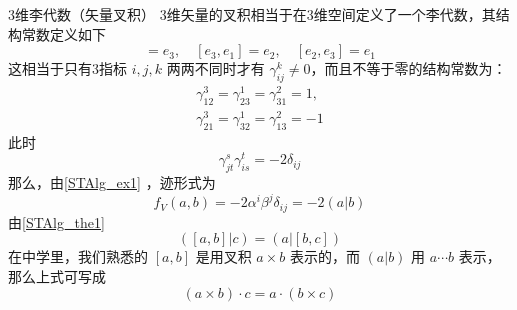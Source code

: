 \begin{example}{3维李代数（矢量叉积）}
3维矢量的叉积相当于在3维空间定义了一个李代数，其结构常数定义如下
\begin{equation}
[e_1,e_2]=e_3,\quad [e_3,e_1]=e_2,\quad [e_2,e_3]=e_1
\end{equation}
这相当于只有3指标 $i,j,k$ 两两不同时才有 $\gamma_{ij}^k\neq0$，而且不等于零的结构常数为：
\begin{equation}
\begin{aligned}
\gamma_{12}^3=\gamma_{23}^1=\gamma_{31}^2=1,\\
\gamma_{21}^3=\gamma_{32}^1=\gamma_{13}^2=-1
\end{aligned}
\end{equation}
此时
\begin{equation}
\gamma_{jt}^s\gamma_{is}^t=-2\delta_{ij}
\end{equation}
那么，由\autoref{STAlg_ex1} ，迹形式为
\begin{equation}
f_V(a,b)=-2\alpha^i\beta^j\delta_{ij}=-2(a|b)
\end{equation}
由\autoref{STAlg_the1} 
\begin{equation}
([a,b]|c)=(a|[b,c])
\end{equation}
在中学里，我们熟悉的 $[a,b]$ 是用叉积 $a\times b$ 表示的，而 $(a|b)$ 用 $a\cdots b$ 表示，那么上式可写成
\begin{equation}
(a\times b)\cdot c=a\cdot(b\times c)
\end{equation}

\end{example}